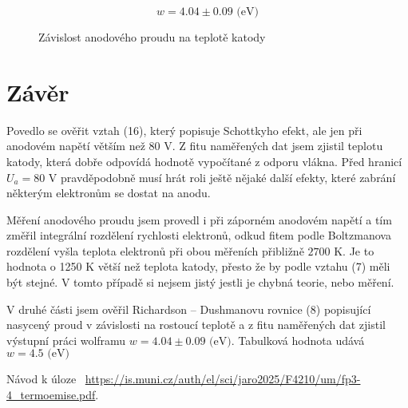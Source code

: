 \documentclass[a4paper,11pt]{article}
\begin{document}
\begin{equation*}
w = 4.04 \pm 0.09 \text{ (eV)}
\end{equation*}

\begin{figure}[h]
    \centering
    
    \caption{Závislost anodového proudu na teplotě katody }
\end{figure}

\section{Závěr}



Povedlo se ověřit vztah (16), který popisuje Schottkyho efekt, ale jen při anodovém napětí větším než 80 V. Z fitu naměřených dat jsem zjistil teplotu katody, která dobře odpovídá hodnotě vypočítané z odporu vlákna. Před hranicí $ U_a = 80 $ V pravděpodobně musí hrát roli ještě nějaké další efekty, které zabrání některým elektronům se dostat na anodu.

Měření anodového proudu jsem provedl i při záporném anodovém napětí a tím změřil integrální rozdělení rychlosti elektronů, odkud fitem podle Boltzmanova rozdělení vyšla teplota elektronů při obou měřeních přibližně $ 2700 $ K. Je to hodnota o 1250 K větší než teplota katody, přesto že by podle vztahu (7) měli být stejné. V tomto případě si nejsem jistý jestli je chybná teorie, nebo měření.

V druhé části jsem ověřil Richardson – Dushmanovu rovnice (8) popisující nasycený proud v závislosti na rostoucí teplotě a z fitu naměřených dat zjistil výstupní práci wolframu $ w = 4.04 \pm 0.09 \text{ (eV)} $. Tabulková hodnota udává $ w = 4.5  \text{ (eV)} $


\begin{thebibliography}{0}
 Návod k úloze ~\url{https://is.muni.cz/auth/el/sci/jaro2025/F4210/um/fp3-4_termoemise.pdf}.   
\end{thebibliography}
\end{document}
